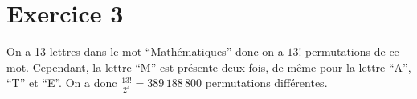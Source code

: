 \part{Exercice 3}

On a 13 lettres dans le mot ``{\sc Mathématiques}'' donc on a  $13!$ permutations de ce mot. Cependant, la lettre ``M'' est présente deux fois, de même pour la lettre ``A'', ``T'' et ``E''. On a donc $\frac{13!}{2^4}=389\,188\,800$ permutations différentes.

